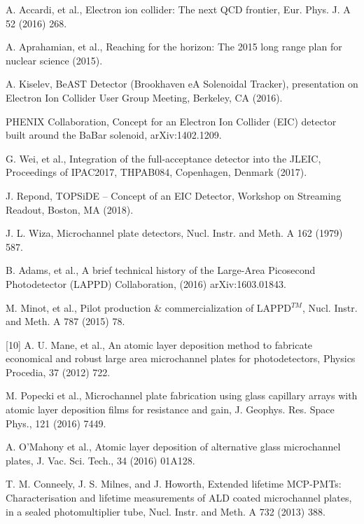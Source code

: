 \documentclass[preprint,5p]{elsarticle}
\begin{document}
\begin{thebibliography}{00}

A. Accardi, et al., Electron ion collider: The next QCD frontier, Eur. Phys.  
      J. A 52 (2016) 268.

A. Aprahamian, et al., Reaching for the horizon: The 2015 long range plan for 
      nuclear science (2015).

A. Kiselev, BeAST Detector (Brookhaven eA Solenoidal Tracker), presentation on 
      Electron Ion Collider User Group Meeting, Berkeley, CA (2016).

PHENIX Collaboration, Concept for an Electron Ion Collider (EIC) detector built 
      around the BaBar solenoid, arXiv:1402.1209.

G. Wei, et al., Integration of the full-acceptance detector into the JLEIC, 
      Proceedings of IPAC2017, THPAB084, Copenhagen, Denmark (2017).

J. Repond, TOPSiDE – Concept of an EIC Detector, Workshop on Streaming Readout, 
      Boston, MA (2018).

J. L. Wiza, Microchannel plate detectors, Nucl. Instr. and Meth. A 162 (1979) 
      587.

B. Adams, et al., A brief technical history of the Large-Area Picosecond 
      Photodetector (LAPPD) Collaboration, (2016) arXiv:1603.01843.

M. Minot, et al., Pilot production \& commercialization of LAPPD$^{𝑇𝑀}$, Nucl.  
      Instr. and Meth. A 787 (2015) 78.

[10] A. U. Mane, et al., An atomic layer deposition method to fabricate economical and robust large area microchannel plates for photodetectors, Physics Procedia, 37 (2012) 722.

M. Popecki et al., Microchannel plate fabrication using glass capillary arrays 
      with atomic layer deposition films for resistance and gain, J.  Geophys.  
      Res. Space Phys., 121 (2016) 7449.

A. O'Mahony et al., Atomic layer deposition of alternative glass microchannel 
      plates, J. Vac. Sci. Tech., 34 (2016) 01A128.

T. M. Conneely, J. S. Milnes, and J. Howorth, Extended lifetime MCP-PMTs: 
      Characterisation and lifetime measurements of ALD coated microchannel 
      plates, in a sealed photomultiplier tube, Nucl. Instr. and Meth. A 732 
      (2013) 388.


\end{thebibliography}
\end{document}
